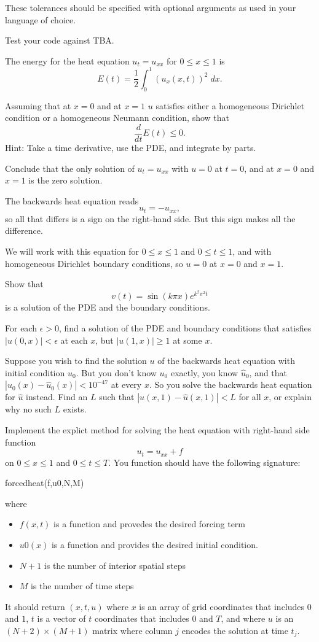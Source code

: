 \documentclass[minion]{homework}
\begin{document}
\begin{problems}
These tolerances should be specified with optional arguments 
as used in your language of choice.

Test your code against TBA.

\problem The energy for the heat equation $u_t=u_{xx}$ 
for $0\le x\le 1$ is
\[
E(t) = \frac{1}{2}\int_0^1 (u_x(x,t))^2\;dx.
\]
\begin{subproblems}
\item Assuming that at $x=0$ and at $x=1$ $u$ satisfies either
a homogeneous Dirichlet condition or a homogeneous Neumann condition,
show that
\[
\frac{d}{dt} E(t) \le 0.
\]
Hint: Take a time derivative, use the PDE, and integrate by parts.
\item Conclude that the only solution of $u_t=u_{xx}$ with $u=0$
at $t=0$, and at $x=0$ and $x=1$ is the zero solution.
\end{subproblems}

\problem The backwards heat equation reads
\[
u_t = -u_{xx},
\]
so all that differs is a sign on the right-hand side.  But this sign makes all the difference.

We will work with this equation for $0\le x \le 1$ and $0\le t\le 1$, and
with homogeneous Dirichlet boundary conditions, so $u=0$ at $x=0$ and $x=1$.
\begin{subproblems}
\item Show that 
\[
v(t) = \sin(k\pi x) e^{k^2\pi^2 t}
\]
is a solution of the PDE and the boundary conditions.
\item For each $\epsilon>0$, find a solution of the PDE and boundary conditions
that satisfies $|u(0,x)|<\epsilon$ at each $x$, but $|u(1,x)|\ge 1$ at some $x$.
\item Suppose you wish to find the solution $u$ of the backwards heat equation with initial condition $u_0$.  But you don't know $u_0$ exactly, you know $\hat u_0$,
and that $|u_0(x)-\hat u_0(x)|<10^{-47}$ at every $x$.  So you solve the
backwards heat equation for $\hat u$ instead.
Find an $L$ such that $|u(x,1)-\hat u(x,1)|<L$ for all $x$, or
explain why no such $L$ exists.
\end{subproblems}

\problem Implement the explict method for solving the heat equation with
right-hand side function
\[
u_t=u_{xx} + f
\]
on $0\le x \le 1$ and $0\le t\le T$.  You function should have
the following signature:

forcedheat(f,u0,N,M)

where 
\begin{itemize}
	\item $f(x,t)$ is a function and provedes the desired forcing term 
	\item $u0(x)$ is a function and provides the desired
initial condition. 
    \item $N+1$ is the number of interior spatial steps
    \item $M$ is the number of time steps
\end{itemize}
It should return $(x,t,u)$ where $x$ is an array of grid coordinates
that includes $0$ and $1$, $t$ is a vector of $t$ coordinates that includes
$0$ and $T$, and where $u$ is an $(N+2)\times(M+1)$ matrix where column
$j$ encodes the solution at time $t_j$.


\end{problems}
\end{document}
